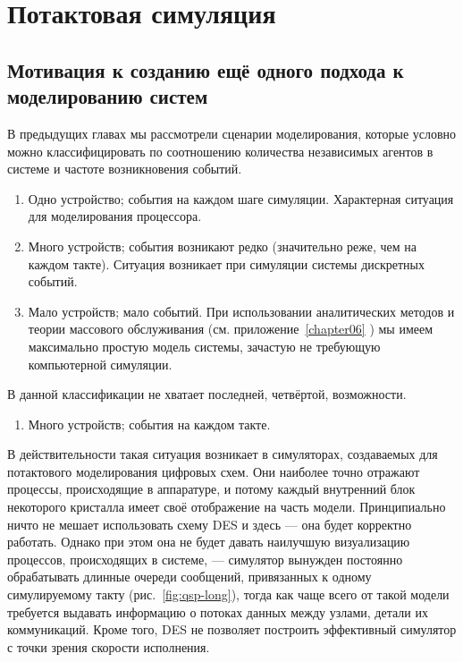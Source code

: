 \chapter{Потактовая симуляция}\label{chapter09}


\section[Мотивация]{Мотивация к созданию ещё одного подхода к моделированию систем}

В предыдущих главах мы рассмотрели сценарии моделирования, которые условно можно классифицировать по соотношению количества независимых агентов в системе и частоте возникновения событий.

\begin{enumerate}
    \item Одно устройство; события на каждом шаге симуляции. Характерная ситуация для моделирования процессора.
    \item Много устройств; события возникают редко (значительно реже, чем на каждом такте). Ситуация возникает при симуляции системы дискретных событий.
    \item Мало устройств; мало событий. При использовании аналитических методов и теории массового обслуживания (см. приложение~\ref{chapter06} ) мы имеем максимально простую модель системы, зачастую не требующую компьютерной симуляции.
\end{enumerate}

В данной классификации не хватает последней, четвёртой, возможности.

\begin{enumerate}[resume] %
    \item Много устройств; события на каждом такте.
\end{enumerate}

В действительности такая ситуация возникает в симуляторах, создаваемых для потактового моделирования  цифровых схем. Они наиболее точно отражают процессы, происходящие в аппаратуре, и потому каждый внутренний блок некоторого кристалла имеет своё отображение на часть модели. Принципиально ничто не мешает использовать схему DES и здесь --- она будет корректно работать. Однако при этом она не будет давать наилучшую визуализацию процессов, происходящих в системе, --- симулятор вынужден постоянно обрабатывать длинные очереди сообщений, привязанных к одному симулируемому такту (рис.~\ref{fig:qsp-long}), тогда как чаще всего от такой модели требуется выдавать информацию о потоках данных между узлами, детали их коммуникаций. Кроме того, DES не позволяет построить эффективный симулятор с точки зрения скорости исполнения.

